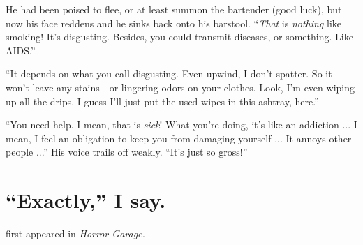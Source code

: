 He had been poised to flee, or at least summon the bartender (good
luck), but now his face reddens and he sinks back onto his barstool.
``\emph{That} is \emph{nothing} like smoking! It's disgusting. Besides,
you could transmit diseases, or something. Like AIDS.''

``It depends on what you call disgusting. Even upwind, I don't spatter.
So it won't leave any stains---or lingering odors on your clothes. Look,
I'm even wiping up all the drips. I guess I'll just put the used wipes
in this ashtray, here.''

``You need help. I mean, that is \emph{sick}! What you're doing, it's
like an addiction ... I mean, I feel an obligation to keep you from
damaging yourself ... It annoys other people ...'' His voice trails off
weakly. ``It's just so gross!''

\hypertarget{exactly-i-say.}{%
\section{``Exactly,'' I say.}\label{exactly-i-say.}}

first appeared in \emph{Horror Garage.}
